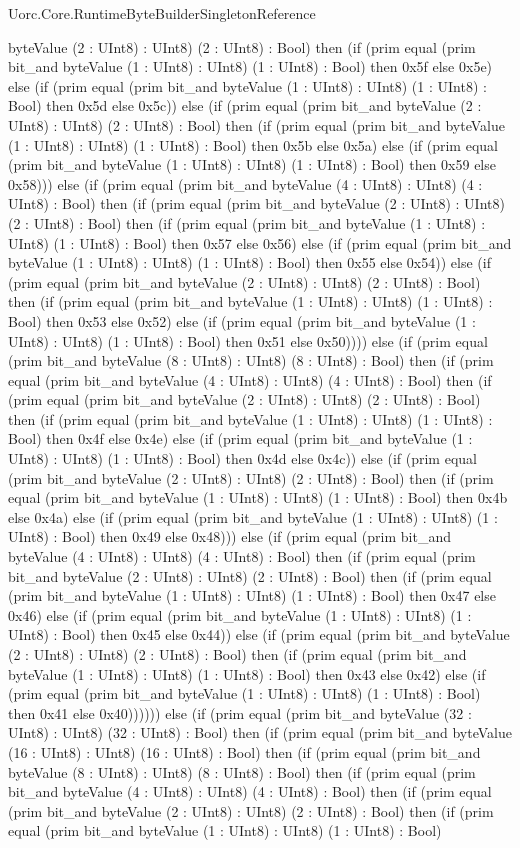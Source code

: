 \begin{lexlean}{Uorc.Core.RuntimeByteBuilderSingletonReference}
\begin{semanticmodule}
{byteValue (2 : UInt8) : UInt8) (2 : UInt8) : Bool) then (if (prim equal (prim bit_and byteValue (1 : UInt8) : UInt8) (1 : UInt8) : Bool) then 0x5f else 0x5e) else (if (prim equal (prim bit_and byteValue (1 : UInt8) : UInt8) (1 : UInt8) : Bool) then 0x5d else 0x5c)) else (if (prim equal (prim bit_and byteValue (2 : UInt8) : UInt8) (2 : UInt8) : Bool) then (if (prim equal (prim bit_and byteValue (1 : UInt8) : UInt8) (1 : UInt8) : Bool) then 0x5b else 0x5a) else (if (prim equal (prim bit_and byteValue (1 : UInt8) : UInt8) (1 : UInt8) : Bool) then 0x59 else 0x58))) else (if (prim equal (prim bit_and byteValue (4 : UInt8) : UInt8) (4 : UInt8) : Bool) then (if (prim equal (prim bit_and byteValue (2 : UInt8) : UInt8) (2 : UInt8) : Bool) then (if (prim equal (prim bit_and byteValue (1 : UInt8) : UInt8) (1 : UInt8) : Bool) then 0x57 else 0x56) else (if (prim equal (prim bit_and byteValue (1 : UInt8) : UInt8) (1 : UInt8) : Bool) then 0x55 else 0x54)) else (if (prim equal (prim bit_and byteValue (2 : UInt8) : UInt8) (2 : UInt8) : Bool) then (if (prim equal (prim bit_and byteValue (1 : UInt8) : UInt8) (1 : UInt8) : Bool) then 0x53 else 0x52) else (if (prim equal (prim bit_and byteValue (1 : UInt8) : UInt8) (1 : UInt8) : Bool) then 0x51 else 0x50)))) else (if (prim equal (prim bit_and byteValue (8 : UInt8) : UInt8) (8 : UInt8) : Bool) then (if (prim equal (prim bit_and byteValue (4 : UInt8) : UInt8) (4 : UInt8) : Bool) then (if (prim equal (prim bit_and byteValue (2 : UInt8) : UInt8) (2 : UInt8) : Bool) then (if (prim equal (prim bit_and byteValue (1 : UInt8) : UInt8) (1 : UInt8) : Bool) then 0x4f else 0x4e) else (if (prim equal (prim bit_and byteValue (1 : UInt8) : UInt8) (1 : UInt8) : Bool) then 0x4d else 0x4c)) else (if (prim equal (prim bit_and byteValue (2 : UInt8) : UInt8) (2 : UInt8) : Bool) then (if (prim equal (prim bit_and byteValue (1 : UInt8) : UInt8) (1 : UInt8) : Bool) then 0x4b else 0x4a) else (if (prim equal (prim bit_and byteValue (1 : UInt8) : UInt8) (1 : UInt8) : Bool) then 0x49 else 0x48))) else (if (prim equal (prim bit_and byteValue (4 : UInt8) : UInt8) (4 : UInt8) : Bool) then (if (prim equal (prim bit_and byteValue (2 : UInt8) : UInt8) (2 : UInt8) : Bool) then (if (prim equal (prim bit_and byteValue (1 : UInt8) : UInt8) (1 : UInt8) : Bool) then 0x47 else 0x46) else (if (prim equal (prim bit_and byteValue (1 : UInt8) : UInt8) (1 : UInt8) : Bool) then 0x45 else 0x44)) else (if (prim equal (prim bit_and byteValue (2 : UInt8) : UInt8) (2 : UInt8) : Bool) then (if (prim equal (prim bit_and byteValue (1 : UInt8) : UInt8) (1 : UInt8) : Bool) then 0x43 else 0x42) else (if (prim equal (prim bit_and byteValue (1 : UInt8) : UInt8) (1 : UInt8) : Bool) then 0x41 else 0x40)))))) else (if (prim equal (prim bit_and byteValue (32 : UInt8) : UInt8) (32 : UInt8) : Bool) then (if (prim equal (prim bit_and byteValue (16 : UInt8) : UInt8) (16 : UInt8) : Bool) then (if (prim equal (prim bit_and byteValue (8 : UInt8) : UInt8) (8 : UInt8) : Bool) then (if (prim equal (prim bit_and byteValue (4 : UInt8) : UInt8) (4 : UInt8) : Bool) then (if (prim equal (prim bit_and byteValue (2 : UInt8) : UInt8) (2 : UInt8) : Bool) then (if (prim equal (prim bit_and byteValue (1 : UInt8) : UInt8) (1 : UInt8) : Bool) }
\end{semanticmodule}
\end{lexlean}
